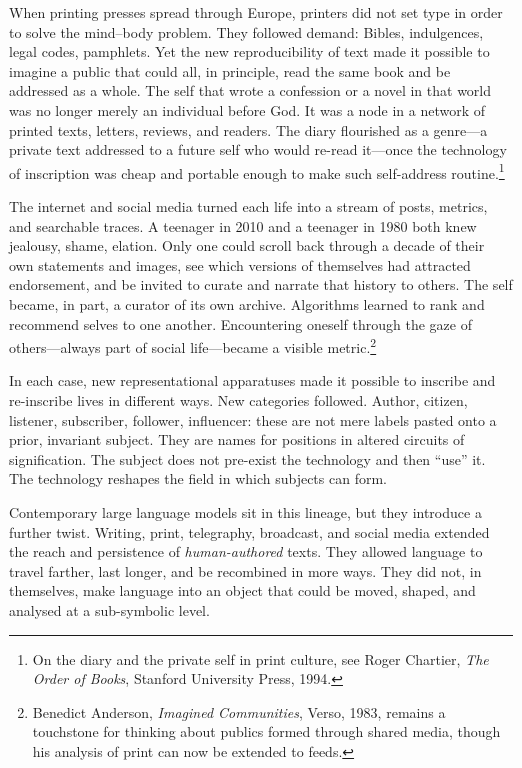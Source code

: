 \documentclass[12pt,a4paper]{report}
\begin{document}
When printing presses spread through Europe, printers did not set type in order to solve the mind--body problem. They followed demand: Bibles, indulgences, legal codes, pamphlets. Yet the new reproducibility of text made it possible to imagine a public that could all, in principle, read the same book and be addressed as a whole. The self that wrote a confession or a novel in that world was no longer merely an individual before God. It was a node in a network of printed texts, letters, reviews, and readers. The diary flourished as a genre---a private text addressed to a future self who would re-read it---once the technology of inscription was cheap and portable enough to make such self-address routine.\footnote{On the diary and the private self in print culture, see Roger Chartier, \emph{The Order of Books}, Stanford University Press, 1994.}

The internet and social media turned each life into a stream of posts, metrics, and searchable traces. A teenager in 2010 and a teenager in 1980 both knew jealousy, shame, elation. Only one could scroll back through a decade of their own statements and images, see which versions of themselves had attracted endorsement, and be invited to curate and narrate that history to others. The self became, in part, a curator of its own archive. Algorithms learned to rank and recommend selves to one another. Encountering oneself through the gaze of others---always part of social life---became a visible metric.\footnote{Benedict Anderson, \emph{Imagined Communities}, Verso, 1983, remains a touchstone for thinking about publics formed through shared media, though his analysis of print can now be extended to feeds.}

In each case, new representational apparatuses made it possible to inscribe and re-inscribe lives in different ways. New categories followed. Author, citizen, listener, subscriber, follower, influencer: these are not mere labels pasted onto a prior, invariant subject. They are names for positions in altered circuits of signification. The subject does not pre-exist the technology and then ``use'' it. The technology reshapes the field in which subjects can form.

Contemporary large language models sit in this lineage, but they introduce a further twist. Writing, print, telegraphy, broadcast, and social media extended the reach and persistence of \emph{human-authored} texts. They allowed language to travel farther, last longer, and be recombined in more ways. They did not, in themselves, make language into an object that could be moved, shaped, and analysed at a sub-symbolic level.
\end{document}
